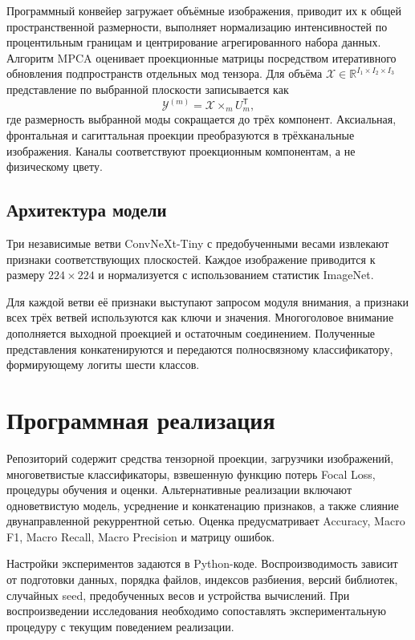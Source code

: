 \documentclass[eqsecnum, authorsinfo]{kioj6}
\begin{document}
Программный конвейер загружает объёмные изображения, приводит их к общей пространственной размерности, выполняет нормализацию интенсивностей по процентильным границам и центрирование агрегированного набора данных. Алгоритм MPCA оценивает проекционные матрицы посредством итеративного обновления подпространств отдельных мод тензора. Для объёма $\mathcal{X}\in\mathbb{R}^{I_1\times I_2\times I_3}$ представление по выбранной плоскости записывается как
\begin{equation}
\mathcal{Y}^{(m)}=\mathcal{X}\times_m U_m^{\mathsf{T}},
\end{equation}
где размерность выбранной моды сокращается до трёх компонент. Аксиальная, фронтальная и сагиттальная проекции преобразуются в трёхканальные изображения. Каналы соответствуют проекционным компонентам, а не физическому цвету.

\subsection{Архитектура модели}
Три независимые ветви ConvNeXt-Tiny с предобученными весами извлекают признаки соответствующих плоскостей. Каждое изображение приводится к размеру $224\times224$ и нормализуется с использованием статистик ImageNet.

Для каждой ветви её признаки выступают запросом модуля внимания, а признаки всех трёх ветвей используются как ключи и значения. Многоголовое внимание дополняется выходной проекцией и остаточным соединением. Полученные представления конкатенируются и передаются полносвязному классификатору, формирующему логиты шести классов.

\section{Программная реализация}
Репозиторий содержит средства тензорной проекции, загрузчики изображений, многоветвистые классификаторы, взвешенную функцию потерь Focal Loss, процедуры обучения и оценки. Альтернативные реализации включают одноветвистую модель, усреднение и конкатенацию признаков, а также слияние двунаправленной рекуррентной сетью. Оценка предусматривает Accuracy, Macro F1, Macro Recall, Macro Precision и матрицу ошибок.

Настройки экспериментов задаются в Python-коде. Воспроизводимость зависит от подготовки данных, порядка файлов, индексов разбиения, версий библиотек, случайных seed, предобученных весов и устройства вычислений. При воспроизведении исследования необходимо сопоставлять экспериментальную процедуру с текущим поведением реализации.
\end{document}

